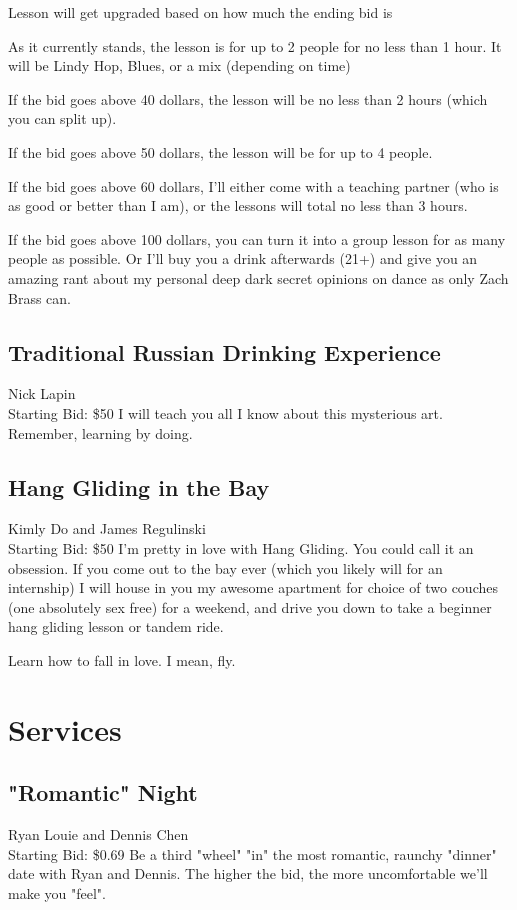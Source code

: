 \documentclass[11pt]{article}
\begin{document}
Lesson will get upgraded based on how much the ending bid is

As it currently stands, the lesson is for up to 2 people for no less than 1 hour. It will be Lindy Hop, Blues, or a mix (depending on time)

If the bid goes above 40 dollars, the lesson will be no less than 2 hours (which you can split up).

If the bid goes above 50 dollars, the lesson will be for up to 4 people.

If the bid goes above 60 dollars, I'll either come with a teaching partner (who is as good or better than I am), or the lessons will total no less than 3 hours.

If the bid goes above 100 dollars, you can turn it into a group lesson for as many people as possible. Or I'll buy you a drink afterwards (21+) and give you an amazing rant about my personal deep dark secret opinions on dance as only Zach Brass can.
\subsection{Traditional Russian Drinking Experience}
Nick Lapin
\\
Starting Bid: \$50
\newline
I will teach you all I know about this mysterious art. Remember, learning by doing.
\subsection{Hang Gliding in the Bay}
Kimly Do and James Regulinski
\\
Starting Bid: \$50
\newline
I'm pretty in love with Hang Gliding. You could call it an obsession. If you come out to the bay ever (which you likely will for an internship) I will house in you my awesome apartment for choice of two couches (one absolutely sex free) for a weekend, and drive you down to take a beginner hang gliding lesson or tandem ride.

Learn how to fall in love. I mean, fly.
\section{Services}
\subsection{"Romantic" Night}
Ryan Louie and Dennis Chen
\\
Starting Bid: \$0.69
\newline
Be a third "wheel" "in" the most romantic, raunchy "dinner" date with Ryan and Dennis.  The higher the bid, the more uncomfortable we'll make you "feel".
\end{document}
